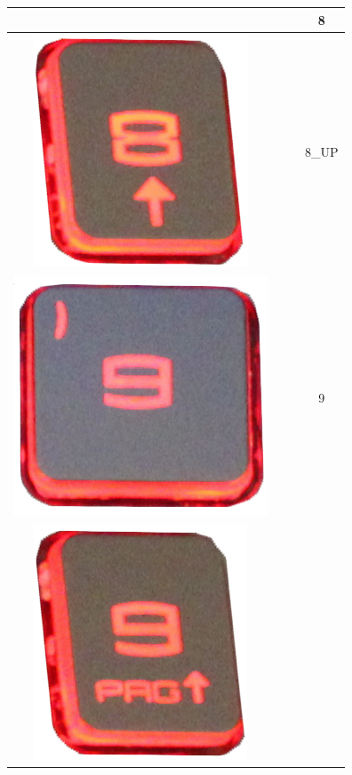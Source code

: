 \begin{longtable}{cccc}
\begin{minipage}[c]{.3\textwidth}
\vspace{0.2cm}
\end{minipage} & & & 8\\
\hline
\begin{minipage}[c]{.3\textwidth}
\vspace{0.2cm}
\includegraphics[scale=0.1]{Images/KeyMapping/8_UP}
\vspace{0.2cm}
\end{minipage} & & & 8\_UP\\
\hline
\begin{minipage}[c]{.3\textwidth}
\vspace{0.2cm}
\includegraphics[scale=0.1]{Images/KeyMapping/9}
\vspace{0.2cm}
\end{minipage} & & & 9\\
\hline
\begin{minipage}[c]{.3\textwidth}
\vspace{0.2cm}
\includegraphics[scale=0.1]{Images/KeyMapping/9_PAGE_UP}

\end{minipage}
\end{longtable}
